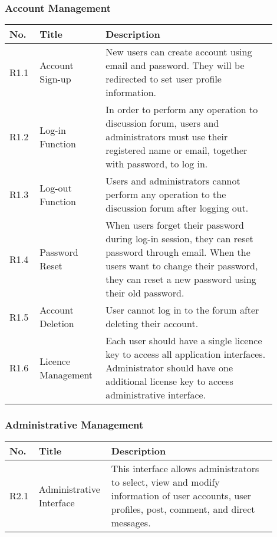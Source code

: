 \documentclass[11pt, a4paper]{article}
\begin{document}
\subsubsection{Account Management}
\begin{tabular}{|>{\centering\arraybackslash}m{0.1\linewidth}|>{\centering\arraybackslash}m{0.2\linewidth}|m{0.6\linewidth}|} \hline
     No.&  Title&Description\\ \hline 
     R1.1&   Account Sign-up &New users can create account using email and password. They will be redirected to set user profile information.\\ \hline 
     R1.2&   Log-in Function&In order to perform any operation to discussion forum, users and administrators must use their registered name or email, together with password, to log in.\\ \hline 
     R1.3&   Log-out Function&Users and administrators cannot perform any operation to the discussion forum after logging out.\\ \hline 
     R1.4&   Password Reset &When users forget their password during log-in session, they can reset password through email. When the users want to change their password, they can reset a new password using their old password.\\ \hline 
     R1.5&   Account Deletion&User cannot log in to the forum after deleting their account.\\\hline
 R1.6& Licence Management&Each user should have a single licence key to access all application interfaces. Administrator should have one additional license key to access administrative interface.\\\hline
\end{tabular}

\smallskip

\subsubsection{Administrative Management}
\begin{tabular}{|>{\centering\arraybackslash}m{0.1\linewidth}|>{\centering\arraybackslash}m{0.2\linewidth}|m{0.6\linewidth}|} \hline
     No.&  Title&Description\\ \hline 
     R2.1&   Administrative Interface&This interface allows administrators to select, view and modify information of user accounts, user profiles, post, comment, and direct messages.\\\hline
\end{tabular}
\end{document}
